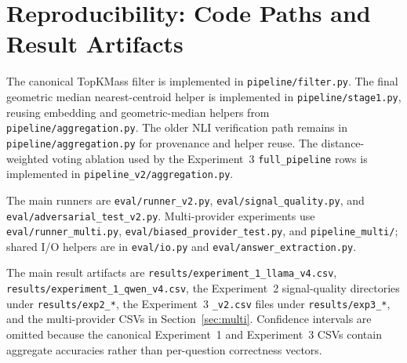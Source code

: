 \documentclass[11pt]{article}
\begin{document}
\section{Reproducibility: Code Paths and Result Artifacts}
\label{app:code}

The canonical TopKMass filter is implemented in \texttt{pipeline/filter.py}. The
final geometric median nearest-centroid helper is implemented in
\texttt{pipeline/stage1.py}, reusing embedding and geometric-median helpers from
\texttt{pipeline/aggregation.py}. The older NLI verification path remains in
\texttt{pipeline/aggregation.py} for provenance and helper reuse. The
distance-weighted voting ablation used by the Experiment~3 \texttt{full\_pipeline}
rows is implemented in \texttt{pipeline\_v2/aggregation.py}.

The main runners are \texttt{eval/runner\_v2.py},
\texttt{eval/signal\_quality.py}, and \texttt{eval/adversarial\_test\_v2.py}.
Multi-provider experiments use \texttt{eval/runner\_multi.py},
\texttt{eval/biased\_provider\_test.py}, and \texttt{pipeline\_multi/}; shared
I/O helpers are in \texttt{eval/io.py} and \texttt{eval/answer\_extraction.py}.

The main result artifacts are \texttt{results/experiment\_1\_llama\_v4.csv},
\texttt{results/experiment\_1\_qwen\_v4.csv}, the Experiment~2 signal-quality
directories under \texttt{results/exp2\_*}, the Experiment~3 \texttt{\_v2.csv}
files under \texttt{results/exp3\_*}, and the multi-provider CSVs in
Section~\ref{sec:multi}. Confidence intervals are omitted because the canonical
Experiment~1 and Experiment~3 CSVs contain aggregate accuracies rather than
per-question correctness vectors.
\end{document}
